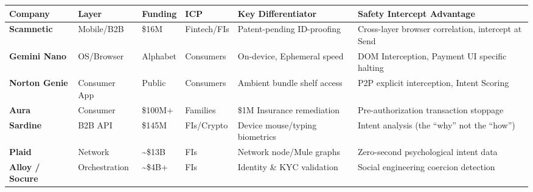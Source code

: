 \documentclass[
]{article}
\newcounter{none} %
\begin{document}
{\def\LTcaptype{none} %
\begin{longtable}[]{@{}
  >{\raggedright\arraybackslash}p{}
  >{\raggedright\arraybackslash}p{}
  >{\raggedright\arraybackslash}p{}
  >{\raggedright\arraybackslash}p{}
  >{\raggedright\arraybackslash}p{}
  >{\raggedright\arraybackslash}p{}@{}}
\toprule\noalign{}
\begin{minipage}[b]{\linewidth}\raggedright
Company
\end{minipage} & \begin{minipage}[b]{\linewidth}\raggedright
Layer
\end{minipage} & \begin{minipage}[b]{\linewidth}\raggedright
Funding
\end{minipage} & \begin{minipage}[b]{\linewidth}\raggedright
ICP
\end{minipage} & \begin{minipage}[b]{\linewidth}\raggedright
Key Differentiator
\end{minipage} & \begin{minipage}[b]{\linewidth}\raggedright
Safety Intercept Advantage
\end{minipage} \\
\midrule\noalign{}
\endhead
\bottomrule\noalign{}
\endlastfoot
\textbf{Scamnetic} & Mobile/B2B & \$16M & Fintech/FIs & Patent-pending
ID-proofing & Cross-layer browser correlation, intercept at Send \\
\textbf{Gemini Nano} & OS/Browser & Alphabet & Consumers & On-device,
Ephemeral speed & DOM Interception, Payment UI specific halting \\
\textbf{Norton Genie} & Consumer App & Public & Consumers & Ambient
bundle shelf access & P2P explicit interception, Intent Scoring \\
\textbf{Aura} & Consumer & \$100M+ & Families & \$1M Insurance
remediation & Pre-authorization transaction stoppage \\
\textbf{Sardine} & B2B API & \$145M & FIs/Crypto & Device mouse/typing
biometrics & Intent analysis (the ``why'' not the ``how'') \\
\textbf{Plaid} & Network & \textasciitilde\$13B & FIs & Network
node/Mule graphs & Zero-second psychological intent data \\
\textbf{Alloy / Socure} & Orchestration & \textasciitilde\$4B+ & FIs &
Identity \& KYC validation & Social engineering coercion detection \\
\end{longtable}
}
\end{document}
